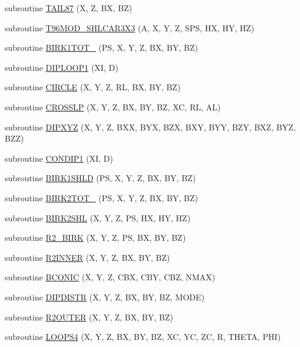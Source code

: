 \begin{CompactItemize}
\item 
subroutine \hyperlink{_t96mod_8f_f7a0147645dfe77e8197e10963ed3770}{TAIL87} (X, Z, BX, BZ)
\item 
subroutine \hyperlink{_t96mod_8f_0918ae2ac8568570f93f2d5c0d88f9dc}{T96MOD\_\-SHLCAR3X3} (A, X, Y, Z, SPS, HX, HY, HZ)
\item 
subroutine \hyperlink{_t96mod_8f_1d35065857c1597a4d45699d6e30faa9}{BIRK1TOT\_} (PS, X, Y, Z, BX, BY, BZ)
\item 
subroutine \hyperlink{_t96mod_8f_7634ccf219c90ebc36de1b55b961ed88}{DIPLOOP1} (XI, D)
\item 
subroutine \hyperlink{_t96mod_8f_7ad3cc17a6906d0de0ea87905c8adfa0}{CIRCLE} (X, Y, Z, RL, BX, BY, BZ)
\item 
subroutine \hyperlink{_t96mod_8f_339de23a7fc16677d5c934050601456b}{CROSSLP} (X, Y, Z, BX, BY, BZ, XC, RL, AL)
\item 
subroutine \hyperlink{_t96mod_8f_76f3ffff48346c7a53f738f013945222}{DIPXYZ} (X, Y, Z, BXX, BYX, BZX, BXY, BYY, BZY, BXZ, BYZ, BZZ)
\item 
subroutine \hyperlink{_t96mod_8f_2432dab29def6a7f82b4e61542784ca2}{CONDIP1} (XI, D)
\item 
subroutine \hyperlink{_t96mod_8f_e7df392ea162336df5811079016b08ac}{BIRK1SHLD} (PS, X, Y, Z, BX, BY, BZ)
\item 
subroutine \hyperlink{_t96mod_8f_72d9123c4c7f8cc57e525a533b45d5fe}{BIRK2TOT\_} (PS, X, Y, Z, BX, BY, BZ)
\item 
subroutine \hyperlink{_t96mod_8f_09ee39e02874a680b5fe915e9ccbc8f6}{BIRK2SHL} (X, Y, Z, PS, HX, HY, HZ)
\item 
subroutine \hyperlink{_t96mod_8f_75644447b8b698b1ea33e1bc67aba7af}{R2\_\-BIRK} (X, Y, Z, PS, BX, BY, BZ)
\item 
subroutine \hyperlink{_t96mod_8f_717e6c5b669e682bef3f33b1a4a73796}{R2INNER} (X, Y, Z, BX, BY, BZ)
\item 
subroutine \hyperlink{_t96mod_8f_1a6fae1af90cf34b2b4e95d5ecde87a9}{BCONIC} (X, Y, Z, CBX, CBY, CBZ, NMAX)
\item 
subroutine \hyperlink{_t96mod_8f_26863a8d653e16bfa831cf1cd3d57367}{DIPDISTR} (X, Y, Z, BX, BY, BZ, MODE)
\item 
subroutine \hyperlink{_t96mod_8f_4b792e262830f77251236192fe6ade49}{R2OUTER} (X, Y, Z, BX, BY, BZ)
\item 
subroutine \hyperlink{_t96mod_8f_8bb46e1322b561a6e5aa91de2b85a0e2}{LOOPS4} (X, Y, Z, BX, BY, BZ, XC, YC, ZC, R, THETA, PHI)
\item 

\end{CompactItemize}
